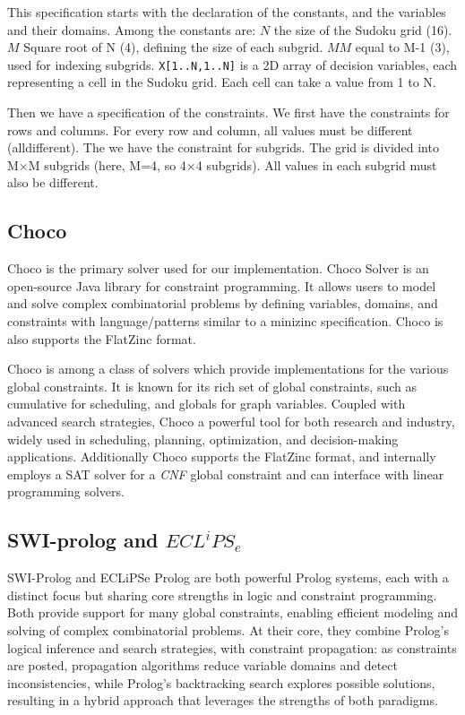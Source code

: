 This specification starts with the declaration of the constants, and the variables and their domains.
Among the constants are:
$N$ the size of the Sudoku grid (16).
$M$ Square root of N (4), defining the size of each subgrid.
$MM$ equal to M-1 (3), used for indexing subgrids.
\texttt{X[1..N,1..N]} is a 2D array of decision variables, each representing a cell in the Sudoku grid. Each cell can take a value from 1 to N.

Then we have a specification of the constraints.
We first have the constraints for rows and columns.
For every row and column, all values must be different (alldifferent).
The we have the constraint for subgrids.
The grid is divided into M×M subgrids (here, M=4, so 4×4 subgrids). 
All values in each subgrid must also be different.


\subsection{Choco}
Choco is the primary solver used for our implementation. 
Choco Solver is an open-source Java library for constraint programming. 
It allows users to model and solve complex combinatorial problems by defining variables, domains, and constraints with language/patterns similar to a minizinc specification.
Choco is also supports the FlatZinc format.

Choco is among a class of solvers which provide implementations for the various global constraints.
It is known for its rich set of global constraints, such as cumulative for scheduling, and globals for graph variables.
Coupled with advanced search strategies, Choco a powerful tool for both research and industry, widely used in scheduling, planning, optimization, and decision-making applications.
Additionally Choco supports the FlatZinc format, and internally employs a SAT solver for a \textit{CNF} global constraint and can interface with linear programming solvers. 

\subsection{SWI-prolog and $ECL^iPS_e$}
SWI-Prolog and ECLiPSe Prolog are both powerful Prolog systems, each with a distinct focus but sharing core strengths in logic and constraint programming.
Both provide support for many global constraints, enabling efficient modeling and solving of complex combinatorial problems.
At their core, they combine Prolog’s logical inference and search strategies, with constraint propagation: as constraints are posted, propagation algorithms reduce variable domains and detect inconsistencies, while Prolog’s backtracking search explores possible solutions, resulting in a hybrid approach that leverages the strengths of both paradigms.

